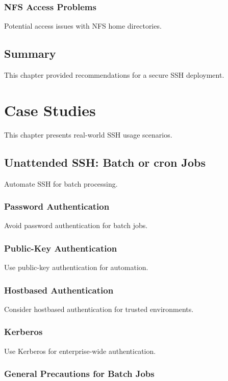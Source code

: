 \documentclass[12pt]{book}
\begin{document}
\subsection{NFS Access Problems}

Potential access issues with NFS home directories.

\section{Summary}

This chapter provided recommendations for a secure SSH deployment.

\chapter{Case Studies}

This chapter presents real-world SSH usage scenarios.

\section{Unattended SSH: Batch or cron Jobs}

Automate SSH for batch processing.

\subsection{Password Authentication}

Avoid password authentication for batch jobs.

\subsection{Public-Key Authentication}

Use public-key authentication for automation.

\subsection{Hostbased Authentication}

Consider hostbased authentication for trusted environments.

\subsection{Kerberos}

Use Kerberos for enterprise-wide authentication.

\subsection{General Precautions for Batch Jobs}
\end{document}
